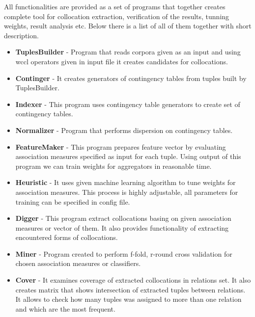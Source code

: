 All functionalities are provided as a set of programs that together creates complete tool for collocation extraction,
verification of the results, tunning weights, result analysis etc. Below there is a list of all of them together with short description.
\begin{itemize}
    \item \textbf{TuplesBuilder} - Program that reads corpora given as an input and using wccl operators given in input file 
    it creates candidates for collocations.
 
    \item \textbf{Continger} - It creates generators of contingency tables from tuples built by TuplesBuilder.
 
    \item \textbf{Indexer} - This program uses contingency table generators to create set of contingency tables.
 
    \item \textbf{Normalizer} - Program that performs dispersion on contingency tables.
 
    \item \textbf{FeatureMaker} - This program prepares feature vector by evaluating association measures specified as input for each tuple. 
    Using output of this program we can train weights for aggregators in reasonable time.
 
    \item \textbf{Heuristic} - It uses given machine learning algorithm to tune weights for association measures. 
    This process is highly adjustable, all parameters for training can be specified in config file.
 
    \item \textbf{Digger} - This program extract collocations basing on given association measures or vector of them. 
    It also provides functionality of extracting encountered forms of collocations.
 
    \item \textbf{Miner} - Program created to perform f-fold, r-round cross validation for chosen association measures or classifiers.
    
    \item \textbf{Cover} - It examines coverage of extracted collocations in relations set. It also creates matrix 
    that shows intersection of extracted tuples between relations. It allows to check how many tuples was assigned to more than one relation 
    and which are the most frequent.
 

\end{itemize}

